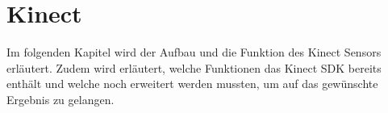 \chapter{Kinect}\label{c:kinect}      %
Im folgenden Kapitel wird der Aufbau und die Funktion des Kinect Sensors erläutert. Zudem
wird erläutert, welche Funktionen das Kinect SDK bereits enthält und welche noch erweitert
werden mussten, um auf das gewünschte Ergebnis zu gelangen.



